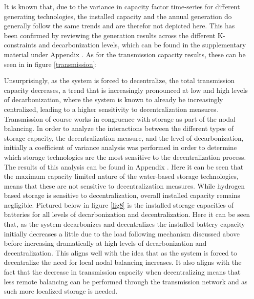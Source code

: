 \documentclass[preprint,12pt,nopreprintline]{elsarticle}
\begin{document}
\newpage

\medskip
\noindent
It is known that, due to the variance in capacity factor time-series for different generating technologies, the installed capacity and the annual generation do generally follow the same trends and are therefor not depicted here. This has been confirmed by reviewing the generation results across the different K-constraints and decarbonization levels, which can be found in the supplementary material under Appendix . As for the transmission capacity results, these can be seen in  in figure \ref{transmission}:

\medskip
\noindent
Unsurprisingly, as the system is forced to decentralize, the total transmission capacity decreases, a trend that is increasingly pronounced at low and high levels of decarbonization, where the system is known to already be increasingly centralized, leading to a higher sensitivity to decentralization measures. Transmission of course works in congruence with storage as part of the nodal balancing. In order to analyze the interactions between the different types of storage capacity, the decentralization measure, and the level of decarbonization, initially a coefficient of variance analysis was performed in order to determine which storage technologies are the most sensitive to the decentralization process. The results of this analysis can be found in Appendix . Here it can be seen that the maximum capacity limited nature of the water-based storage technologies, means that these are not sensitive to decentralization measures. While hydrogen based storage is sensitive to decentralization, overall installed capacity remains negligible. Pictured below in  figure \ref{fig8} is the installed storage capacities of batteries for all levels of decarbonization and decentralization. Here it can be seen that, as the system decarbonizes and decentralizes the installed battery capacity initially decreases a little due to the load following mechanism discussed above before increasing dramatically at high levels of decarbonization and decentralization. This aligns well with the idea that as the system is forced to decentralize the need for local nodal balancing increases. It also aligns with the fact that the decrease in transmission capacity when decentralizing means that less remote balancing can be performed through the transmission network and as such more localized storage is needed.
\end{document}
